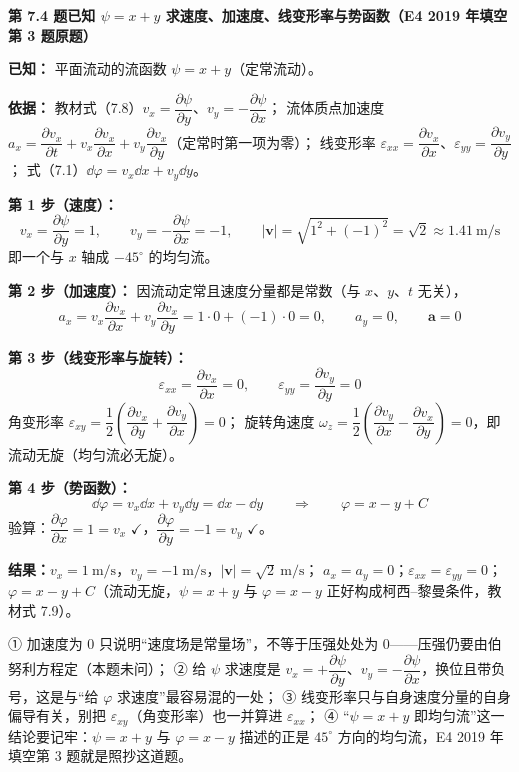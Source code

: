 \noindent\textbf{第 7.4 题\quad 已知 $\psi=x+y$ 求速度、加速度、线变形率与势函数（E4 2019 年填空第 3 题原题）}

\begin{jie}
\textbf{已知：} 平面流动的流函数 $\psi=x+y$（定常流动）。

\textbf{依据：} 教材式（7.8）$v_x=\dfrac{\partial\psi}{\partial y}$、$v_y=-\dfrac{\partial\psi}{\partial x}$；
流体质点加速度 $a_x=\dfrac{\partial v_x}{\partial t}+v_x\dfrac{\partial v_x}{\partial x}+v_y\dfrac{\partial v_x}{\partial y}$（定常时第一项为零）；
线变形率 $\varepsilon_{xx}=\dfrac{\partial v_x}{\partial x}$、$\varepsilon_{yy}=\dfrac{\partial v_y}{\partial y}$；
式（7.1）$\dd\varphi=v_x\dd x+v_y\dd y$。

\textbf{第 1 步（速度）：}
\[
v_x=\frac{\partial\psi}{\partial y}=1,\qquad v_y=-\frac{\partial\psi}{\partial x}=-1,\qquad
|\bm{v}|=\sqrt{1^2+(-1)^2}=\sqrt{2}\approx 1.41\ \mathrm{m/s}
\]
即一个与 $x$ 轴成 $-45^\circ$ 的均匀流。

\textbf{第 2 步（加速度）：} 因流动定常且速度分量都是常数（与 $x$、$y$、$t$ 无关），
\[
a_x=v_x\frac{\partial v_x}{\partial x}+v_y\frac{\partial v_x}{\partial y}=1\cdot 0+(-1)\cdot 0=0,\qquad a_y=0,\qquad \bm{a}=0
\]

\textbf{第 3 步（线变形率与旋转）：}
\[
\varepsilon_{xx}=\frac{\partial v_x}{\partial x}=0,\qquad \varepsilon_{yy}=\frac{\partial v_y}{\partial y}=0
\]
角变形率 $\varepsilon_{xy}=\dfrac{1}{2}\left(\dfrac{\partial v_x}{\partial y}+\dfrac{\partial v_y}{\partial x}\right)=0$；
旋转角速度 $\omega_z=\dfrac{1}{2}\left(\dfrac{\partial v_y}{\partial x}-\dfrac{\partial v_x}{\partial y}\right)=0$，即流动无旋（均匀流必无旋）。

\textbf{第 4 步（势函数）：}
\[
\dd\varphi=v_x\dd x+v_y\dd y=\dd x-\dd y\qquad\Longrightarrow\qquad \varphi=x-y+C
\]
验算：$\dfrac{\partial\varphi}{\partial x}=1=v_x$ $\checkmark$，$\dfrac{\partial\varphi}{\partial y}=-1=v_y$ $\checkmark$。

\textbf{结果：}$v_x=1\ \mathrm{m/s}$，$v_y=-1\ \mathrm{m/s}$，$|\bm v|=\sqrt2\ \mathrm{m/s}$；
$a_x=a_y=0$；$\varepsilon_{xx}=\varepsilon_{yy}=0$；$\varphi=x-y+C$（流动无旋，$\psi=x+y$ 与 $\varphi=x-y$ 正好构成柯西--黎曼条件，教材式 7.9）。
\end{jie}

\begin{yicuo}
① 加速度为 0 只说明“速度场是常量场”，不等于压强处处为 0——压强仍要由伯努利方程定（本题未问）；
② 给 $\psi$ 求速度是 $v_x=+\dfrac{\partial\psi}{\partial y}$、$v_y=-\dfrac{\partial\psi}{\partial x}$，换位且带负号，这是与“给 $\varphi$ 求速度”最容易混的一处；
③ 线变形率只与自身速度分量的自身偏导有关，别把 $\varepsilon_{xy}$（角变形率）也一并算进 $\varepsilon_{xx}$；
④ “$\psi=x+y$ 即均匀流”这一结论要记牢：$\psi=x+y$ 与 $\varphi=x-y$ 描述的正是 $45^\circ$ 方向的均匀流，E4 2019 年填空第 3 题就是照抄这道题。
\end{yicuo}

